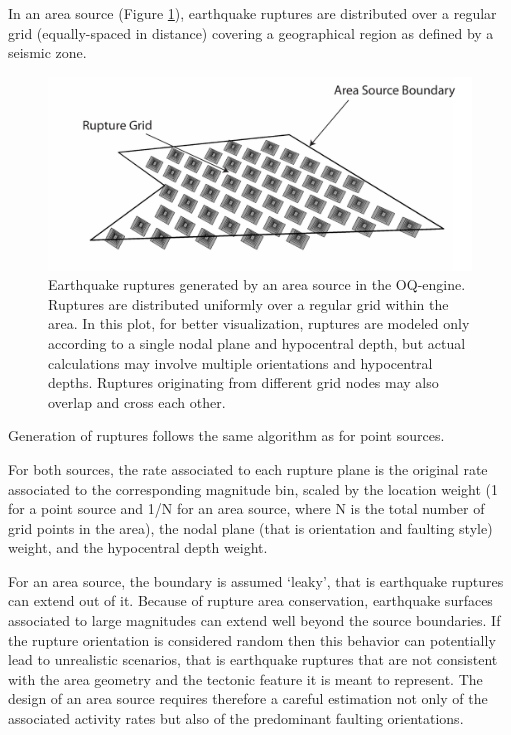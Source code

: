 In an area source (Figure \ref{fig:AreaSource}), earthquake ruptures are
distributed over a regular grid (equally-spaced in distance) covering a
geographical region as defined by a seismic zone. 
\begin{figure}
\centering
\includegraphics[width=14cm]{./Pictures/AreaSource.pdf}
\caption{Earthquake ruptures generated by an area source in the OQ-engine.
Ruptures are distributed uniformly over a regular grid within the area. In this
plot, for better visualization, ruptures are modeled only according to a single
nodal plane and hypocentral depth, but actual calculations may involve multiple
orientations and hypocentral depths. Ruptures originating from different grid
nodes may also overlap and cross each other.}
\label{fig:AreaSource}
\end{figure}
Generation of ruptures follows the same algorithm as for point sources.

For both sources, the rate associated to each rupture plane is the original rate
associated to the corresponding magnitude bin, scaled by the location weight (1
for a point source and 1/N for an area source, where N is the total number of
grid points in the area), the nodal plane (that is orientation and faulting
style) weight, and the hypocentral depth weight.

For an area source, the boundary is assumed ‘leaky’, that is earthquake ruptures
can extend out of it. Because of rupture area conservation, earthquake surfaces
associated to large magnitudes can extend well beyond the source boundaries. If
the rupture orientation is considered random then this behavior can potentially
lead to unrealistic scenarios, that is earthquake ruptures that are not
consistent with the area geometry and the tectonic feature it is meant to
represent. The design of an area source requires therefore a careful estimation
not only of the associated activity rates but also of the predominant faulting
orientations.


